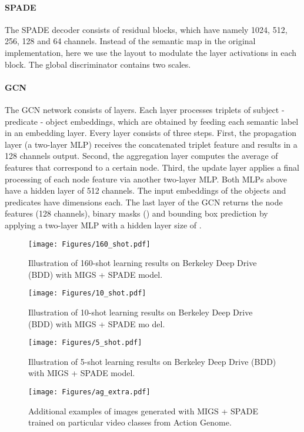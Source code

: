 \documentclass{bmvc2k}
\begin{document}
\paragraph{SPADE} The SPADE decoder consists of  residual blocks, which have namely 1024, 512, 256, 128 and 64 channels. Instead of the semantic map in the original implementation, here we use the layout to modulate the layer activations in each block. The global discriminator  contains two scales. 

\paragraph{GCN} The GCN network consists of  layers. Each layer processes triplets of subject - predicate - object embeddings, which are obtained by feeding each semantic label in an embedding layer. Every layer consists of three steps. First, the propagation layer (a two-layer MLP) receives the concatenated triplet feature and results in a 128 channels output. Second, the aggregation layer computes the average of features that correspond to a certain node. Third, the update layer applies a final processing of each node feature via another two-layer MLP. Both MLPs above have a hidden layer of 512 channels. The input embeddings of the objects and predicates have  dimensions each.
The last layer of the GCN returns the node features (128 channels), binary masks () and bounding box prediction by applying a two-layer MLP with a hidden layer size of .


\begin{figure*}
    \centering
    \texttt{[image: Figures/160\_shot.pdf]}
    \caption{Illustration of 160-shot learning results on Berkeley Deep Drive (BDD) with MIGS + SPADE model.}
    \label{fig:160shot}
\end{figure*}

\begin{figure*}
    \centering
    \texttt{[image: Figures/10\_shot.pdf]}
    \caption{Illustration of 10-shot learning results on Berkeley Deep Drive (BDD) with MIGS + SPADE mo    del.}
    \label{fig:10shot}
\end{figure*}

\begin{figure*}
    \centering
    \texttt{[image: Figures/5\_shot.pdf]}
    \caption{Illustration of 5-shot learning results on Berkeley Deep Drive (BDD) with MIGS + SPADE model.}
    \label{fig:5shot}
\end{figure*}

\begin{figure}
    \centering
    \texttt{[image: Figures/ag\_extra.pdf]}
    \caption{Additional examples of images generated with MIGS + SPADE trained on particular video classes from Action Genome.}
    \label{fig:ag_extra}
\end{figure}
\end{document}
